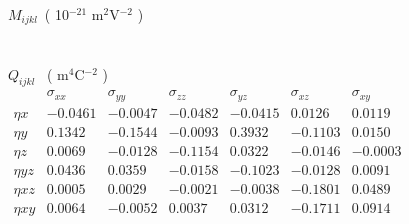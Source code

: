 \documentclass[a4paper,10pt]{article}
\begin{document}
$M_{ijkl}$~( 10$^{-21}$ m$^{2}$V$^{-2}$ )\\
\\
\\
$Q_{ijkl}$ ~( m$^{4}$C$^{-2}$ )\\
$
\begin{matrix}
           &  \sigma_{xx} & \sigma_{yy} & \sigma_{zz} & \sigma_{yz} & \sigma_{xz} & \sigma_{xy} \\
\eta{x}  &  -0.0461   & -0.0047 & -0.0482 & -0.0415 &  0.0126 &  0.0119 \\
\eta{y}  &   0.1342   & -0.1544 & -0.0093 &  0.3932 & -0.1103 &  0.0150 \\
\eta{z}  &   0.0069   & -0.0128 & -0.1154 &  0.0322 & -0.0146 & -0.0003 \\
\eta{yz} &   0.0436   &  0.0359 & -0.0158 & -0.1023 & -0.0128 &  0.0091 \\
\eta{xz} &   0.0005   &  0.0029 & -0.0021 & -0.0038 & -0.1801 &  0.0489 \\
\eta{xy} &   0.0064   & -0.0052 &  0.0037 &  0.0312 & -0.1711 &  0.0914 \\
\end{matrix}
$
\end{document}
